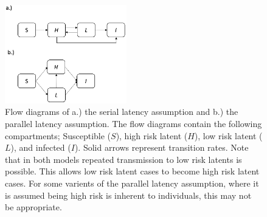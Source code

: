\documentclass[11pt,twoside]{bristolthesis}
\begin{document}
  \begin{figure}
  
  {\centering \includegraphics[width=200px]{chapters/model-development/resources/model_diagrams/latency_flow} 
  
  }
  
  \caption{Flow diagrams of a.) the serial latency assumption and b.) the parallel latency assumption. The flow diagrams contain the following compartments; Susceptible ($S$), high risk latent ($H$), low risk latent ($L$), and infected ($I$). Solid arrows represent transition rates. Note that in both models repeated transmission to low risk latents is possible. This allows low risk latent cases to become high risk latent cases. For some varients of the parallel latency assumption, where it is assumed being high risk is inherent to individuals, this may not be appropriate.}\label{fig:latency-flow-diag}
  \end{figure}
\end{document}
